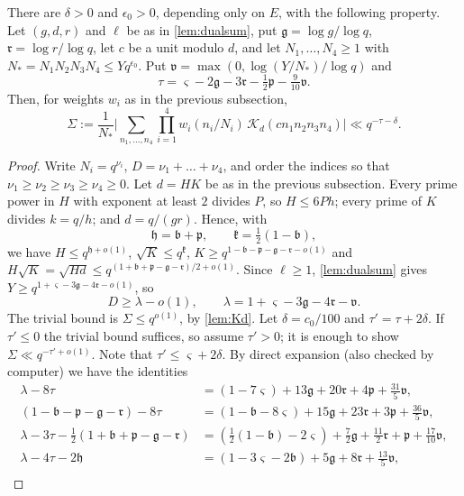 \documentclass[11pt,colorlinks]{charlie}
\begin{document}
\begin{lemma}\label{lem:block}
There are $\delta>0$ and $\epsilon_0>0$, depending only on $E$, with the following property. Let $(g,d,r)$ and $\ell$ be as in \cref{lem:dualsum}, put $\mathfrak g=\log g/\log q$, $\mathfrak r=\log r/\log q$, let $c$ be a unit modulo $d$, and let $N_1,\dots,N_4\ge1$ with $N_*=N_1N_2N_3N_4\le Yq^{\epsilon_0}$. Put $\mathfrak v=\max(0,\log(Y/N_*)/\log q)$ and
\[
 \tau=\varsigma-2\mathfrak g-3\mathfrak r-\tfrac12\mathfrak p-\tfrac9{10}\mathfrak v .
\]
Then, for weights $w_i$ as in the previous subsection,
\[
 \Sigma:=\frac1{N_*}\Big|\sum_{n_1,\dots,n_4}\prod_{i=1}^4w_i(n_i/N_i)\,\mathscr K_d(cn_1n_2n_3n_4)\Big|\ll q^{-\tau-\delta}.
\]
\end{lemma}
\begin{proof}
Write $N_i=q^{\nu_i}$, $D=\nu_1+\dots+\nu_4$, and order the indices so that $\nu_1\ge\nu_2\ge\nu_3\ge\nu_4\ge0$. Let $d=HK$ be as in the previous subsection. Every prime power in $H$ with exponent at least $2$ divides $P$, so $H\le6Ph$; every prime of $K$ divides $k=q/h$; and $d=q/(gr)$. Hence, with
\[
 \mathfrak h=\mathfrak b+\mathfrak p,\qquad\mathfrak k=\tfrac12(1-\mathfrak b),
\]
we have $H\le q^{\mathfrak h+o(1)}$, $\sqrt K\le q^{\mathfrak k}$, $K\ge q^{1-\mathfrak b-\mathfrak p-\mathfrak g-\mathfrak r-o(1)}$ and $H\sqrt K=\sqrt{Hd}\le q^{(1+\mathfrak b+\mathfrak p-\mathfrak g-\mathfrak r)/2+o(1)}$. Since $\ell\ge1$, \cref{lem:dualsum} gives $Y\ge q^{1+\varsigma-3\mathfrak g-4\mathfrak r-o(1)}$, so
\[
 D\ge\lambda-o(1),\qquad\lambda=1+\varsigma-3\mathfrak g-4\mathfrak r-\mathfrak v .
\]
The trivial bound is $\Sigma\le q^{o(1)}$, by \cref{lem:Kd}. Let $\delta=c_0/100$ and $\tau'=\tau+2\delta$. If $\tau'\le0$ the trivial bound suffices, so assume $\tau'>0$; it is enough to show $\Sigma\ll q^{-\tau'+o(1)}$. Note that $\tau'\le\varsigma+2\delta$. By direct expansion (also checked by computer) we have the identities
\begin{align*}
 \lambda-8\tau&=(1-7\varsigma)+13\mathfrak g+20\mathfrak r+4\mathfrak p+\tfrac{31}5\mathfrak v,\\
 (1-\mathfrak b-\mathfrak p-\mathfrak g-\mathfrak r)-8\tau&=(1-\mathfrak b-8\varsigma)+15\mathfrak g+23\mathfrak r+3\mathfrak p+\tfrac{36}5\mathfrak v,\\
 \lambda-3\tau-\tfrac12(1+\mathfrak b+\mathfrak p-\mathfrak g-\mathfrak r)&=(\tfrac12(1-\mathfrak b)-2\varsigma)+\tfrac72\mathfrak g+\tfrac{11}2\mathfrak r+\mathfrak p+\tfrac{17}{10}\mathfrak v,\\
 \lambda-4\tau-2\mathfrak h&=(1-3\varsigma-2\mathfrak b)+5\mathfrak g+8\mathfrak r+\tfrac{13}5\mathfrak v,\\

\end{align*}
\end{proof}
\end{document}
